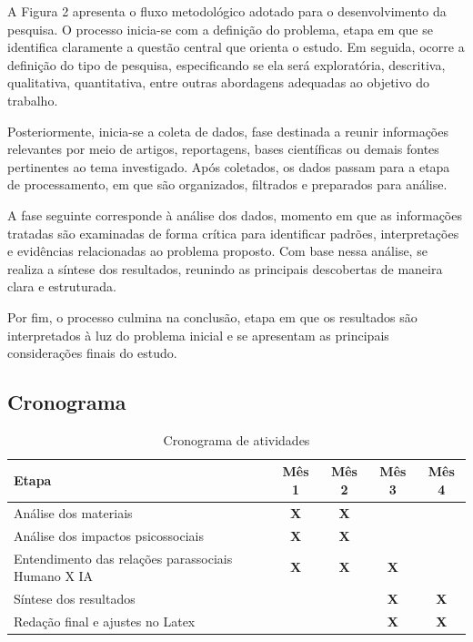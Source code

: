 \documentclass[12pt]{article}
\begin{document}
A Figura 2 apresenta o fluxo metodológico adotado para o desenvolvimento da pesquisa. O processo inicia-se com a definição do problema, etapa em que se identifica claramente a questão central que orienta o estudo. Em seguida, ocorre a definição do tipo de pesquisa, especificando se ela será exploratória, descritiva, qualitativa, quantitativa, entre outras abordagens adequadas ao objetivo do trabalho.

Posteriormente, inicia-se a coleta de dados, fase destinada a reunir informações relevantes por meio de artigos, reportagens, bases científicas ou demais fontes pertinentes ao tema investigado. Após coletados, os dados passam para a etapa de processamento, em que são organizados, filtrados e preparados para análise.

A fase seguinte corresponde à análise dos dados, momento em que as informações tratadas são examinadas de forma crítica para identificar padrões, interpretações e evidências relacionadas ao problema proposto. Com base nessa análise, se realiza a síntese dos resultados, reunindo as principais descobertas de maneira clara e estruturada.

Por fim, o processo culmina na conclusão, etapa em que os resultados são interpretados à luz do problema inicial e se apresentam as principais considerações finais do estudo.

\subsection{Cronograma}

\begin{table}[ht]
    \centering
    \caption{Cronograma de atividades}
    \label{tab:cronograma}
    \begin{tabular}{lcccc}
        \toprule
        \textbf{Etapa} & \textbf{Mês 1} & \textbf{Mês 2} & \textbf{Mês 3} & \textbf{Mês 4} \\
        \midrule
        Análise dos materiais & \textbf{X} & \textbf{X} & & \\
        Análise dos impactos psicossociais & \textbf{X} & \textbf{X} & & \\
        Entendimento das relações parassociais Humano X IA & \textbf{X} & \textbf{X} & \textbf{X} & \\
        Síntese dos resultados & & & \textbf{X} & \textbf{X} \\
        Redação final e ajustes no Latex & & & \textbf{X} & \textbf{X} \\
        \bottomrule
    \end{tabular}
\end{table}
\end{document}
